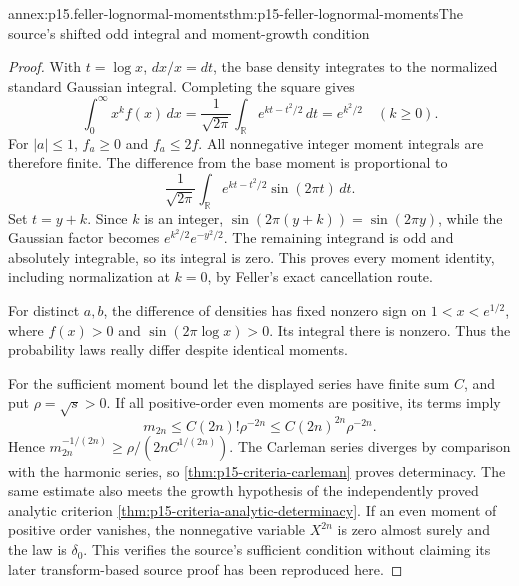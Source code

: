 \begin{annexitem}{annex:p15.feller-lognormal-moments}{thm:p15-feller-lognormal-moments}{The source's shifted odd integral and moment-growth condition}
\begin{proof}
With \(t=\log x\), \(dx/x=dt\), the base density integrates to the
normalized standard Gaussian integral. Completing the square gives
\[
 \int_0^\infty x^k f(x)\,dx
    =\frac1{\sqrt{2\pi}}\int_{\mathbb R}e^{kt-t^2/2}\,dt
    =e^{k^2/2}\quad(k\geq0).
\]
For \(|a|\leq1\), \(f_a\geq0\) and \(f_a\leq2f\).
All nonnegative integer moment integrals are therefore finite.
The difference from the base moment is proportional to
\[
 \frac1{\sqrt{2\pi}}\int_{\mathbb R}
             e^{kt-t^2/2}\sin(2\pi t)\,dt.
\]
Set \(t=y+k\). Since \(k\) is an integer,
\(\sin(2\pi(y+k))=\sin(2\pi y)\), while the Gaussian factor
becomes \(e^{k^2/2}e^{-y^2/2}\).
The remaining integrand is odd and absolutely integrable, so its
integral is zero. This proves every moment identity, including
normalization at \(k=0\), by Feller's exact cancellation route.

For distinct \(a,b\), the difference of densities has fixed nonzero
sign on \(1<x<e^{1/2}\), where \(f(x)>0\) and
\(\sin(2\pi\log x)>0\). Its integral there is nonzero.
Thus the probability laws really differ despite identical moments.

For the sufficient moment bound let the displayed series have finite
sum \(C\), and put \(\rho=\sqrt s>0\).
If all positive-order even moments are positive, its terms imply
\[
                m_{2n}\leq C(2n)!\rho^{-2n}
                           \leq C(2n)^{2n}\rho^{-2n}.
\]
Hence
\(m_{2n}^{-1/(2n)}\geq \rho/(2nC^{1/(2n)})\).
The Carleman series diverges by comparison with the harmonic series,
so \cref{thm:p15-criteria-carleman} proves determinacy.
The same estimate also meets the growth hypothesis of the independently
proved analytic criterion \cref{thm:p15-criteria-analytic-determinacy}.
If an even moment of positive order vanishes, the nonnegative
variable \(X^{2n}\) is zero almost surely and the law is \(\delta_0\).
This verifies the source's sufficient condition without claiming its
later transform-based source proof has been reproduced here.
\end{proof}
\end{annexitem}

